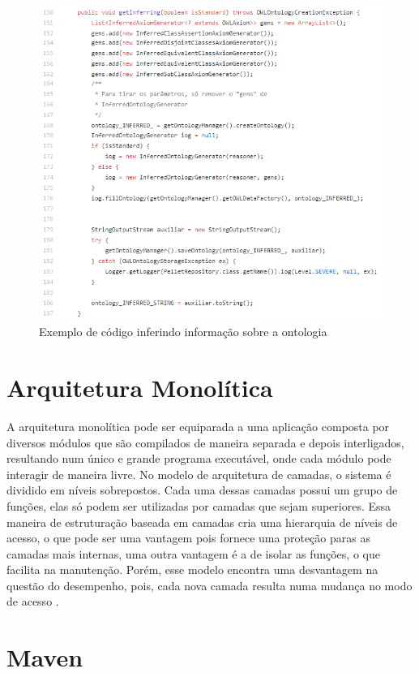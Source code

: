 \documentclass{bcc}
\begin{document}
\begin{figure}[H]
\centering
\includegraphics[width=1\textwidth]{Figuras/pellet_inferencia.png}
\caption{Exemplo de código inferindo informação sobre a ontologia}
\label{fig:pellet_inferencia}
\end{figure}

\section{Arquitetura Monolítica}

A arquitetura monolítica pode ser equiparada a uma aplicação composta por diversos módulos que são compilados de maneira separada e depois interligados, resultando num único e grande programa executável, onde cada módulo pode interagir de maneira livre. No modelo de arquitetura de camadas, o sistema é dividido em níveis sobrepostos. Cada uma dessas camadas possui um grupo de funções, elas só podem ser utilizadas por camadas que sejam superiores. Essa maneira de estruturação baseada em camadas cria uma hierarquia de níveis de acesso, o que pode ser uma vantagem pois fornece uma proteção paras as camadas mais internas, uma outra vantagem é a de isolar as funções, o que facilita na manutenção. Porém, esse modelo encontra uma desvantagem na questão do desempenho, pois, cada nova camada resulta numa mudança no modo de acesso \cite{machado2004}.


\section{Maven}
\end{document}
